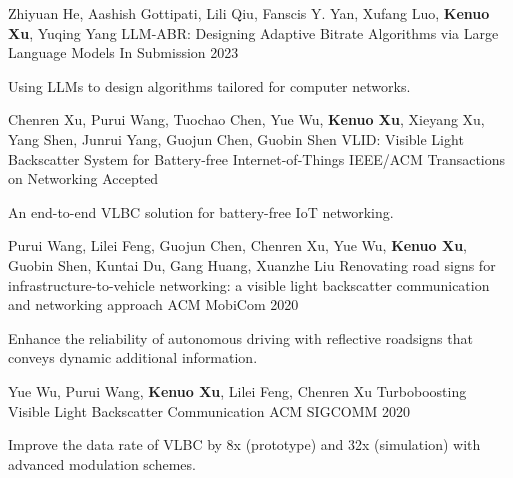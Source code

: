 \documentclass[11pt, a4paper]{awesome-cv}
\begin{document}
\begin{cventries}
	\cventry
	{Zhiyuan He, Aashish Gottipati, Lili Qiu, Fanscis Y. Yan, Xufang Luo, \textbf{Kenuo Xu}, Yuqing Yang}
	{LLM-ABR: Designing Adaptive Bitrate Algorithms via Large Language Models}
	{In Submission}
	{2023}
	{
		\begin{cvitems} %
			\item {Using LLMs to design algorithms tailored for computer networks.}
		\end{cvitems}
	}

	\cventry
	{Chenren Xu, Purui Wang, Tuochao Chen, Yue Wu, \textbf{Kenuo Xu}, Xieyang Xu, Yang Shen, Junrui Yang, Guojun Chen, Guobin Shen}
	{VLID: Visible Light Backscatter System for Battery-free Internet-of-Things}
	{IEEE/ACM Transactions on Networking}
	{Accepted}
	{
		\begin{cvitems} %
			\item {An end-to-end VLBC solution for battery-free IoT networking.}
		\end{cvitems}
	}
	
	\cventry
	{Purui Wang, Lilei Feng, Guojun Chen, Chenren Xu, Yue Wu, \textbf{Kenuo Xu}, Guobin Shen, Kuntai Du, Gang Huang, Xuanzhe Liu}
	{Renovating road signs for infrastructure-to-vehicle networking: a visible light backscatter communication and networking approach}
	{ACM MobiCom}
	{2020}
	{
		\begin{cvitems} %
			\item {Enhance the reliability of autonomous driving with reflective roadsigns that conveys dynamic additional information.}
		\end{cvitems}
	}
	
	\cventry
	{Yue Wu, Purui Wang, \textbf{Kenuo Xu}, Lilei Feng, Chenren Xu}
	{Turboboosting Visible Light Backscatter Communication}
	{ACM SIGCOMM}
	{2020}
	{
		\begin{cvitems} %
			\item {Improve the data rate of VLBC by 8x (prototype) and 32x (simulation) with advanced modulation schemes.}
		\end{cvitems}
	}
	
	
\end{cventries}

\end{document}
